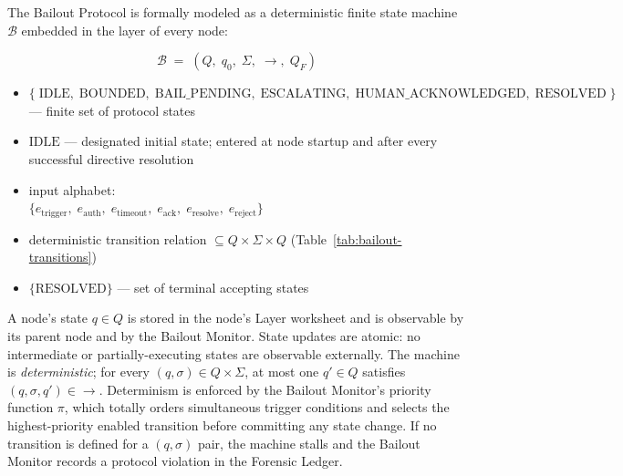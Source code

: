 The Bailout Protocol is formally modeled as a deterministic finite state machine $\mathcal{B}$ embedded in the \fact{} layer of every \bxthree{} node:

\[
\mathcal{B} \;=\; (Q,\; q_0,\; \Sigma,\; \rightarrow,\; Q_F)
\]

\begin{itemize}\itemsep=0pt
\item[$Q$] $\{\;\text{IDLE},\; \text{BOUNDED},\; \text{BAIL\_PENDING},\; \text{ESCALATING},\; \text{HUMAN\_ACKNOWLEDGED},\; \text{RESOLVED}\; \}$ — finite set of protocol states
\item[$q_0$] $\text{IDLE}$ — designated initial state; entered at node startup and after every successful directive resolution
\item[$\Sigma$] input alphabet:\\ $\{e_{\text{trigger}},\; e_{\text{auth}},\; e_{\text{timeout}},\; e_{\text{ack}},\; e_{\text{resolve}},\; e_{\text{reject}}\}$
\item[$\rightarrow$] deterministic transition relation $\subseteq Q \times \Sigma \times Q$ (Table~\ref{tab:bailout-transitions})
\item[$Q_F$] $\{\text{RESOLVED}\}$ — set of terminal accepting states
\end{itemize}

A node's state $q \in Q$ is stored in the node's \fact{} Layer worksheet and is observable by its parent node and by the Bailout Monitor. State updates are atomic: no intermediate or partially-executing states are observable externally. The machine is \emph{deterministic}; for every $(q, \sigma) \in Q \times \Sigma$, at most one $q' \in Q$ satisfies $(q, \sigma, q') \in \rightarrow$. Determinism is enforced by the Bailout Monitor's priority function $\pi$, which totally orders simultaneous trigger conditions and selects the highest-priority enabled transition before committing any state change. If no transition is defined for a $(q, \sigma)$ pair, the machine stalls and the Bailout Monitor records a protocol violation in the Forensic Ledger.

